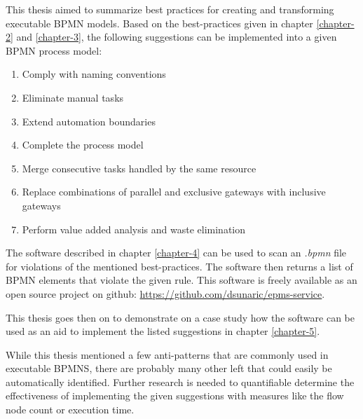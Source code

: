 This thesis aimed to summarize best practices for creating and transforming executable BPMN models. Based on the best-practices given in chapter \ref{chapter-2} and \ref{chapter-3}, the following suggestions can be implemented into a given BPMN process model:
\begin{enumerate}
	\item Comply with naming conventions
	\item Eliminate manual tasks
	\item Extend automation boundaries
	\item Complete the process model
	\item Merge consecutive tasks handled by the same resource
	\item Replace combinations of parallel and exclusive gateways with inclusive gateways
	\item Perform value added analysis and waste elimination
\end{enumerate}

The software described in chapter \ref{chapter-4} can be used to scan an \textit{.bpmn} file for violations of the mentioned best-practices. The software then returns a list of BPMN elements that violate the given rule. This software is freely available as an open source project on github:  \url{https://github.com/dsunaric/epms-service}. 

This thesis goes then on to demonstrate on a case study how the software can be used as an aid to implement the listed suggestions in chapter \ref{chapter-5}. 

While this thesis mentioned a few anti-patterns that are commonly used in executable BPMNS, there are probably many other left that could easily be automatically identified. Further research is needed to quantifiable determine the effectiveness of implementing the given suggestions with measures like the flow node count or execution time. 